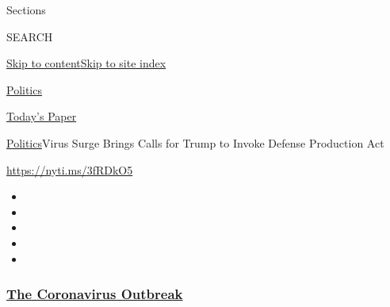 Sections

SEARCH

\protect\hyperlink{site-content}{Skip to
content}\protect\hyperlink{site-index}{Skip to site index}

\href{https://www.nytimes3xbfgragh.onion/section/politics}{Politics}

\href{https://myaccount.nytimes3xbfgragh.onion/auth/login?response_type=cookie\&client_id=vi}{}

\href{https://www.nytimes3xbfgragh.onion/section/todayspaper}{Today's
Paper}

\href{/section/politics}{Politics}\textbar{}Virus Surge Brings Calls for
Trump to Invoke Defense Production Act

\url{https://nyti.ms/3fRDkO5}

\begin{itemize}
\item
\item
\item
\item
\item
\end{itemize}

\hypertarget{the-coronavirus-outbreak}{%
\subsubsection{\texorpdfstring{\href{https://www.nytimes3xbfgragh.onion/news-event/coronavirus?name=styln-coronavirus-national\&region=TOP_BANNER\&block=storyline_menu_recirc\&action=click\&pgtype=Article\&impression_id=639b7e90-f2c7-11ea-afab-d96c7c69d660\&variant=undefined}{The
Coronavirus
Outbreak}}{The Coronavirus Outbreak}}\label{the-coronavirus-outbreak}}

